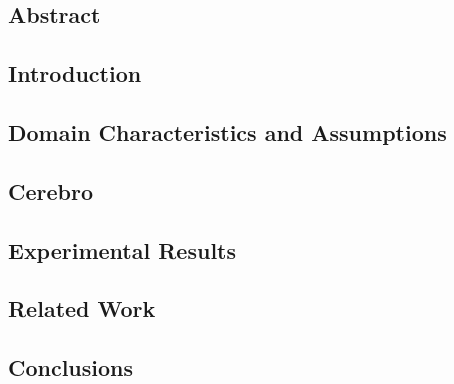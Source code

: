 \subsection{Abstract}


\subsection{Introduction}
\label{sec:cerbro_intro}


\subsection{Domain Characteristics and Assumptions}
\label{sec:cerebro_approach}



\subsection{Cerebro}
\label{sec:cerebro_design}


\subsection{Experimental Results}
\label{sec:cerebro_results}


\subsection{Related Work}
\label{sec:cerebro_related_work}


\subsection{Conclusions}
\label{sec:cerebro_onclusions}

